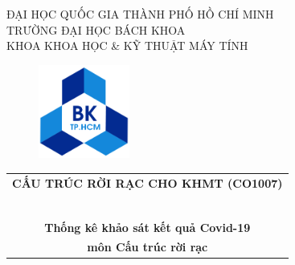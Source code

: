 \documentclass[a4paper]{article}
\theoremstyle{definition}
\begin{document}
\begin{titlepage}
\begin{center}
ĐẠI HỌC QUỐC GIA THÀNH PHỐ HỒ CHÍ MINH \\
TRƯỜNG ĐẠI HỌC BÁCH KHOA \\
KHOA KHOA HỌC \& KỸ THUẬT MÁY TÍNH 
\end{center}

\vspace{1cm}

\begin{figure}[h!]
\begin{center}
\includegraphics[width=3cm]{Images/hcmut.png}
\end{center}
\end{figure}

\vspace{1cm}


\begin{center}
\begin{tabular}{c}
\multicolumn{1}{l}{\textbf{{\Large CẤU TRÚC RỜI RẠC CHO KHMT (CO1007)}}}\\
~~\\
\hline
\\
\textbf{\large Thống kê khảo sát kết quả Covid-19}\\
\textbf{\large môn Cấu trúc rời rạc}
\\
\hline
\end{tabular}
\end{center}

\vspace{1.5cm}


\end{titlepage}
\end{document}
